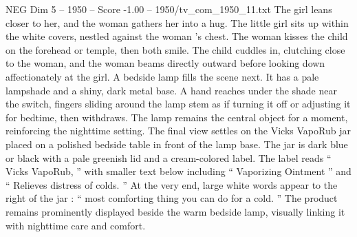 \begin{textsample}{NEG Dim 5 – 1950 – Score -1.00 – 1950/tv\_com\_1950\_11.txt}
The girl leans closer to her, and the woman gathers her into a hug.
The little girl sits up within the white covers, nestled against the woman ’s chest.
The woman kisses the child on the forehead or temple, then both smile.
The child cuddles in, clutching close to the woman, and the woman beams directly outward before looking down affectionately at the girl.
A bedside lamp fills the scene next.
It has a pale lampshade and a shiny, dark metal base.
A hand reaches under the shade near the switch, fingers sliding around the lamp stem as if turning it off or adjusting it for bedtime, then withdraws.
The lamp remains the central object for a moment, reinforcing the nighttime setting.
The final view settles on the Vicks VapoRub jar placed on a polished bedside table in front of the lamp base.
The jar is dark blue or black with a pale greenish lid and a cream-colored label.
The label reads “ Vicks VapoRub, ” with smaller text below including “ Vaporizing Ointment ” and “ Relieves distress of colds. ” At the very end, large white words appear to the right of the jar : “ most comforting thing you can do for a cold. ” The product remains prominently displayed beside the warm bedside lamp, visually linking it with nighttime care and comfort.

\end{textsample}
